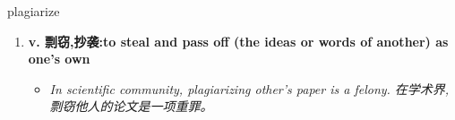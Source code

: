 
\begin{frame}
{\huge plagiarize}
\begin{center}
\begin{enumerate}\Large
  \item \textbf{v. 剽窃,抄袭:to steal and pass off (the ideas or words of another) as one's own}
  \begin{itemize}
    \item \em{\Large{In scientific community, plagiarizing other’s paper is a felony. 在学术界,剽窃他人的论文是一项重罪。}}
  \end{itemize}
\end{enumerate}
\end{center}
\end{frame}
